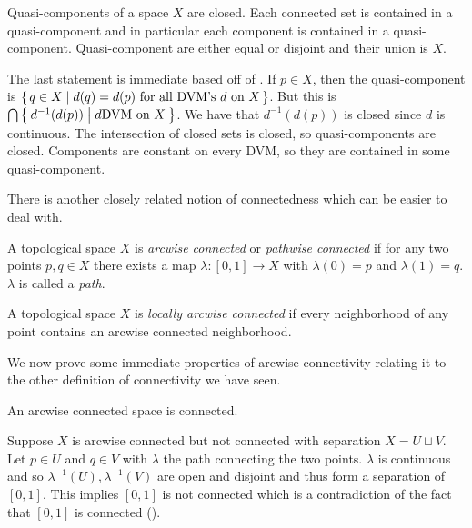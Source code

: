 \documentclass[letterpaper, 11pt]{article}
\begin{document}
\begin{prop}
  Quasi-components of a space $X$ are closed.
  Each connected set is contained in a quasi-component and in particular each component is contained in a quasi-component.
  Quasi-component are either equal or disjoint and their union is $X$.
\end{prop}
\begin{pf}
  The last statement is immediate based off of .
  If $p \in X$, then the quasi-component is $\set{q \in X | d(q) = d(p) \text{ for all DVM's } d \text{ on } X}$.
  But this is $\bigcap \Set{d^{-1}(d(p)) | d \text{DVM on } X}$.
  We have that $d^{-1}(d(p))$ is closed since $d$ is continuous.
  The intersection of closed sets is closed, so quasi-components are closed.
  Components are constant on every DVM, so they are contained in some quasi-component.
\end{pf}

There is another closely related notion of connectedness which can be easier to deal with.

\begin{defn}
  A topological space $X$ is \emph{arcwise connected} or \emph{pathwise connected} if for any two points $p,q \in X$ there exists a map $\lambda\colon [0, 1] \to X$ with $\lambda(0) = p$ and $\lambda(1) = q$.
  $\lambda$ is called a \emph{path}.
\end{defn}

\begin{defn}
  A topological space $X$ is \emph{locally arcwise connected} if every neighborhood of any point contains an arcwise connected neighborhood.
\end{defn}

We now prove some immediate properties of arcwise connectivity relating it to the other definition of connectivity we have seen.

\begin{prop}
  An arcwise connected space is connected.
\end{prop}
\begin{pf}
  Suppose $X$ is arcwise connected but not connected with separation $X = U \sqcup V$.
  Let $p \in U$ and $q \in V$ with $\lambda$ the path connecting the two points.
  $\lambda$ is continuous and so $\lambda^{-1}(U), \lambda^{-1}(V)$ are open and disjoint and thus form a separation of $[0, 1]$.
  This implies $[0, 1]$ is not connected which is a contradiction of the fact that $[0, 1]$ is connected ().
\end{pf}
\end{document}
